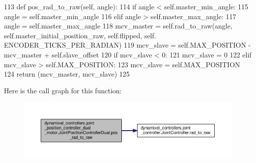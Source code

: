 \begin{DoxyCode}
113     \textcolor{keyword}{def }pos\_rad\_to\_raw(self, angle):
114         \textcolor{keywordflow}{if} angle < self.master\_min\_angle: 
115             angle = self.master\_min\_angle
116         \textcolor{keywordflow}{elif} angle > self.master\_max\_angle: 
117             angle = self.master\_max\_angle
118         mcv\_master = self.rad\_to\_raw(angle, self.master\_initial\_position\_raw, self.flipped, self.
      ENCODER\_TICKS\_PER\_RADIAN)
119         mcv\_slave = self.MAX\_POSITION - mcv\_master + self.slave\_offset
120         \textcolor{keywordflow}{if} mcv\_slave < 0: 
121             mcv\_slave = 0
122         \textcolor{keywordflow}{elif} mcv\_slave > self.MAX\_POSITION: 
123             mcv\_slave = self.MAX\_POSITION
124         \textcolor{keywordflow}{return} (mcv\_master, mcv\_slave)
125         
\end{DoxyCode}
Here is the call graph for this function\+:
\nopagebreak
\begin{figure}[H]
\begin{center}
\leavevmode
\includegraphics[width=350pt]{d7/d04/classdynamixel__controllers_1_1joint__position__controller__dual__motor_1_1_joint_position_controller_dual_a8db51ee1aefb3eec4fec62ed230936a5_cgraph}
\end{center}
\end{figure}
\mbox{\label{classdynamixel__controllers_1_1joint__position__controller__dual__motor_1_1_joint_position_controller_dual_a039ec66c11ba0c6942ccc0b28b2fc3cf}} 

